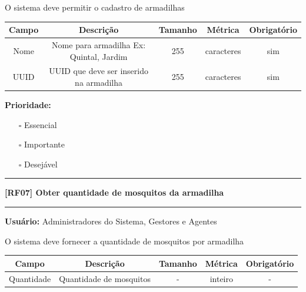 	O sistema deve permitir o cadastro de armadilhas
	
	\begin{center}
		\begin{adjustbox}{width=\textwidth}      \begin{tabular}{ |c|c|c|c|c| } 
			\hline
			\rowcolor{lightgray} Campo & Descrição & Tamanho & Métrica & Obrigatório \\
			\hline
			Nome & Nome para armadilha Ex: Quintal, Jardim & 255 & caracteres & sim \\ 
			\hline  
			UUID & UUID que deve ser inserido na armadilha & 255 & caracteres & sim \\ 
			\hline  
		\end{tabular}    \end{adjustbox}
	\end{center}
	
	\textbf{Prioridade: }\begin{itemize}
		\item[\hspace{1cm}\rlap{\raisebox{0.2ex}{\hspace{0.4ex}\scriptsize \ding{56}}}$\square$]
		Essencial
		\item[\hspace{1cm}$\square$]
		Importante
		\item[\hspace{1cm}$\square$]
		Desejável
	\end{itemize}
	\begin{center}
		\noindent\rule{10cm}{0.4pt}
		\textbf{[RF07] Obter quantidade de mosquitos da armadilha}
		\noindent\rule{10cm}{0.4pt}
	\end{center}
	\textbf{Usuário:} Administradores do Sistema, Gestores e Agentes
	
	O sistema deve fornecer a quantidade de mosquitos por armadilha
	
	\begin{center}
		\begin{adjustbox}{width=\textwidth}      \begin{tabular}{ |c|c|c|c|c| } 
			\hline
			\rowcolor{lightgray} Campo & Descrição & Tamanho & Métrica & Obrigatório \\
			\hline
			Quantidade & Quantidade de mosquitos & - & inteiro & - \\    
			\hline 
		\end{tabular}    \end{adjustbox}
	\end{center}
	
